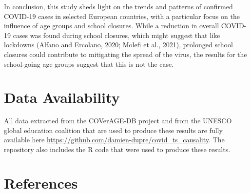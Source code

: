 \documentclass[unnumsec,webpdf,contemporary,large]{oup-authoring-template}%
\theoremstyle{thmstyleone}%
\theoremstyle{thmstyletwo}%
\theoremstyle{thmstylethree}%
\begin{document}
In conclusion, this study sheds light on the trends and patterns of confirmed COVID-19 cases in selected European countries, with a particular focus on the influence of age groups and school closures. While a reduction in overall COVID-19 cases was found during school closures, which might suggest that like lockdowns (Alfano and Ercolano, 2020; Molefi et al., 2021), prolonged school closures could contribute to mitigating the spread of the virus, the results for the school-going age groups suggest that this is not the case.

\hypertarget{data-availability}{%
\section{Data Availability}\label{data-availability}}

All data extracted from the COVerAGE-DB project and from the UNESCO global education coalition that are used to produce these results are fully available here \url{https://github.com/damien-dupre/covid_ts_causality}. The repository also includes the R code that were used to produce these results.

\hypertarget{references}{%
\section*{References}\label{references}}
\end{document}
